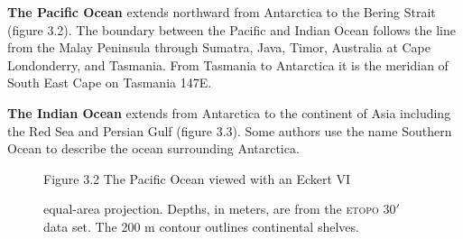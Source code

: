 \textbf{The Pacific Ocean} extends
northward from Antarctica to the Bering Strait (figure 3.2). The
boundary between the Pacific and Indian Ocean follows the line from
the Malay Peninsula through Sumatra, Java, Timor, Australia at Cape
Londonderry, and Tasmania. From Tasmania to Antarctica it is the
meridian of South East Cape on Tasmania 147\degrees E.

\textbf{The Indian Ocean} extends from
Antarctica to the continent of Asia including the Red Sea and Persian
Gulf (figure 3.3). Some authors use the name Southern Ocean to
describe the ocean surrounding Antarctica.

\begin{figure}[t!]
\centering
\footnotesize
Figure 3.2 The Pacific Ocean viewed with an Eckert VI\rule{0mm}{3ex}
equal-area projection. Depths, in meters, are from the \textsc{etopo}
30$'$ data set. The 200 m contour outlines continental shelves.

\label{fig:pacific}
\vspace{-4ex}
\end{figure}

